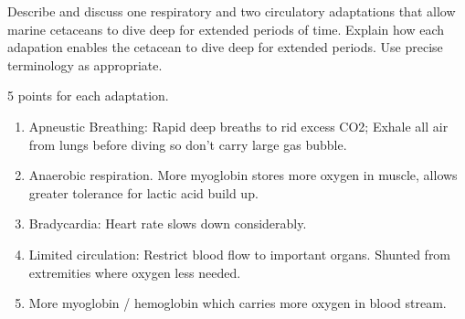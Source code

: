 \documentclass[11pt]{exam}
\begin{document}
\begin{questions}

\newpage

\question[15]
Describe and discuss one respiratory and two circulatory adaptations that allow marine cetaceans to dive deep for extended periods of time. Explain how each adapation enables the cetacean to dive deep for extended periods. Use precise terminology as appropriate. 

\begin{solution}
	5 points for each adaptation.
	\begin{enumerate}
	\item Apneustic Breathing: Rapid deep breaths to rid excess CO2; Exhale all air from lungs before diving so don't carry large gas bubble.
	\item Anaerobic respiration. More myoglobin stores more oxygen in muscle, allows greater tolerance for lactic acid build up.
	\item Bradycardia: Heart rate slows down considerably.
	\item Limited circulation: Restrict blood flow to important organs. Shunted from extremities where oxygen less needed.
	\item More myoglobin / hemoglobin which carries more oxygen in blood stream.
	\end{enumerate}
\end{solution}


\end{questions}
\end{document}
